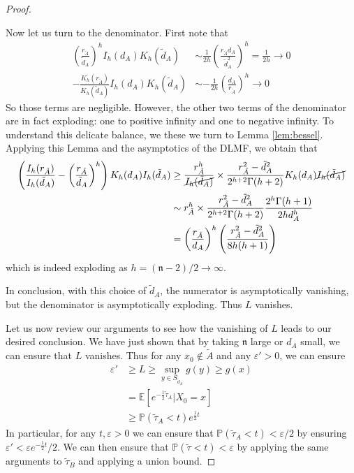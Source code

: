 \documentclass[english, aip, jcp, priprint, graphicx,floatfix]{revtex4-1}
\theoremstyle{plain}
\theoremstyle{definition}
\theoremstyle{plain}
\newcommand{\dimension}{{\mathfrak{n}}}
\begin{document}
\begin{proof}
\begin{itemize}
    Now let us turn to the denominator.  First note that 
    \begin{align*}
     \left( \frac{r_{\tilde{A}}}{\tilde{d}_A}\right)^h  
	    I_h (d_A)K_h ( \tilde{d}_A) &\sim \frac{1}{2h}\left(\frac{r_{\tilde{A}} d_A}{\tilde d_A^2}\right)^h = \frac{1}{2h} \rightarrow 0\\
     - \frac{K_h ( r_{\tilde{A}})}{K_h ( \tilde{d}_A)} 
	    I_h (d_A)K_h ( \tilde{d}_A) &\sim -\frac{1}{2h}\left(\frac{d_A}{r_{\tilde A}}\right)^h \rightarrow 0
    \end{align*}
    So those terms are negligible.  However, the other two terms of the denominator are in fact exploding: one to positive infinity and one to negative infinity.  To understand this delicate balance, we these we turn to Lemma \ref{lem:bessel}.  Applying this Lemma and the asymptotics of the DLMF, we obtain that
    \begin{align*}
    \left( \frac{I_h ( r_{\tilde{A}})}{I_h ( \tilde{d}_A)} - \left(\frac{r_{\tilde{A}}}{\tilde{d}_A} \right)^h  \right)
                K_h ( d_A) I_h ( \tilde{d}_A) 
        &\geq \frac{r_{\tilde{A}}^h}{\cancel{I_h(\tilde{d}_A)}}\times\frac{r_{\tilde{A}}^{2} -\tilde{d}_A^{2}}{2^{h+2}\Gamma(h+2)} K_h ( d_A) \cancel{I_h ( \tilde{d}_A)} \\
        &\sim r_{\tilde{A}}^h\times\frac{r_{\tilde{A}}^{2} -\tilde{d}_A^{2}}{2^{h+2}\Gamma(h+2)} \frac{2^h \Gamma(h+1)}{2hd_A^h}  \\
        &=\left(\frac{r_{\tilde{A}}}{d_A} \right)^h \left(\frac{r_{\tilde A}^2 - \tilde d_A^2}{8h(h+1)}\right)
    \end{align*}
    which is indeed exploding as $h=(\dimension-2)/2 \rightarrow \infty$.  

    In conclusion, with this choice of $\tilde d_A$, the numerator is asymptotically vanishing, but the denominator is asymptotically exploding.  Thus $L$ vanishes.
\end{itemize}

Let us now review our arguments to see how the vanishing of $L$ leads to our desired conclusion.  We have just shown that by taking $\dimension$ large or $d_A$ small, we can ensure that $L$ vanishes.  Thus for any $x_0\notin \tilde A$ and any $\varepsilon'>0$, we can ensure
\begin{align*}
\varepsilon' & \geq L \geq \sup_{y \in S_{\tilde d_A}} g(y) \geq g(x) \\
            & = \mathbb{E}[e^{-\frac{1}{2}\tilde \tau_A}|X_0=x]\\
            & \geq \mathbb{P}(\tilde \tau_A < t) e^{\frac{1}{2} t}
\end{align*}
In particular, for any $t,\varepsilon>0$ we can ensure that $\mathbb{P}(\tilde \tau_A < t)<\varepsilon/2$ by ensuring $\varepsilon' < \varepsilon e^{-\frac{1}{2} t}/2$.  We can then ensure that $\mathbb{P}(\tilde \tau < t)<\varepsilon$ by applying the same arguments to $\tilde \tau_B$ and applying a union bound.

\end{proof}
\end{document}
